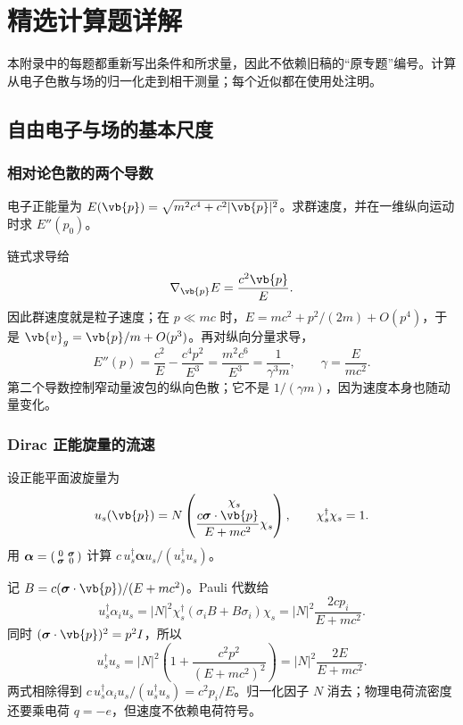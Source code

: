 \chapter{精选计算题详解}

本附录中的每题都重新写出条件和所求量，因此不依赖旧稿的“原专题”编号。计算从电子色散与场的归一化走到相干测量；每个近似都在使用处注明。

\section{自由电子与场的基本尺度}

\subsection*{相对论色散的两个导数}
电子正能量为 \(E(\vb{p})=\sqrt{m^2c^4+c^2|\vb{p}|^2}\)。求群速度，并在一维纵向运动时求 \(E''(p_0)\)。

链式求导给
\[
\nabla_{\vb{p}}E=\frac{c^2\vb{p}}{E}.
\]
因此群速度就是粒子速度；在 \(p\ll mc\) 时，\(E=mc^2+p^2/(2m)+O(p^4)\)，于是 \(\vb{v}_g=\vb{p}/m+O(p^3)\)。再对纵向分量求导，
\[
E''(p)=\frac{c^2}{E}-\frac{c^4p^2}{E^3}
=\frac{m^2c^6}{E^3}=\frac1{\gamma^3m},
\qquad \gamma=\frac{E}{mc^2}.
\]
第二个导数控制窄动量波包的纵向色散；它不是 \(1/(\gamma m)\)，因为速度本身也随动量变化。

\subsection*{Dirac 正能旋量的流速}
设正能平面波旋量为
\[
u_s(\vb{p})=N
\begin{pmatrix}\chi_s\\
\dfrac{c\boldsymbol\sigma\cdot\vb{p}}{E+mc^2}\chi_s
\end{pmatrix},
\qquad \chi_s^\dagger\chi_s=1.
\]
用 \(\boldsymbol\alpha=\begin{psmallmatrix}0&\boldsymbol\sigma\\
\boldsymbol\sigma&0\end{psmallmatrix}\) 计算 \(c\,u_s^\dagger\boldsymbol\alpha u_s/(u_s^\dagger u_s)\)。

记 \(B=c(\boldsymbol\sigma\cdot\vb{p})/(E+mc^2)\)。Pauli 代数给
\[
u_s^\dagger\alpha_i u_s
=|N|^2\chi_s^\dagger(\sigma_iB+B\sigma_i)\chi_s
=|N|^2\frac{2cp_i}{E+mc^2}.
\]
同时 \((\boldsymbol\sigma\cdot\vb{p})^2=p^2I\)，所以
\[
u_s^\dagger u_s
=|N|^2\left(1+\frac{c^2p^2}{(E+mc^2)^2}\right)
=|N|^2\frac{2E}{E+mc^2}.
\]
两式相除得到 \(c\,u_s^\dagger\alpha_i u_s/(u_s^\dagger u_s)=c^2p_i/E\)。归一化因子 \(N\) 消去；物理电荷流密度还要乘电荷 \(q=-e\)，但速度不依赖电荷符号。

